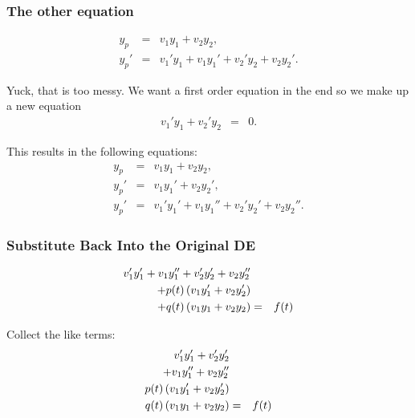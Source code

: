\begin{frame}
  \frametitle{The other equation}

  \begin{eqnarray*}
    y_p & = & v_1 y_1 + v_2 y_2, \\
    y_p' & = & v_1' y_1 + v_1 y_1' + v_2' y_2 + v_2 y_2'. 
  \end{eqnarray*}

  Yuck, that is too messy. We want a first order equation in the end
  so we make up a new equation
  \begin{eqnarray}
    \label{eqn:firstConstraint}
    v_1' y_1 + v_2' y_2 & = & 0.
  \end{eqnarray}

  This results in the following equations:
  \begin{eqnarray*}
    y_p & = & v_1 y_1 + v_2 y_2, \\
    y_p' & = & v_1 y_1' + v_2 y_2', \\
    y_p' & = & v_1' y_1' + v_1 y_1'' + v_2' y_2' + v_2 y_2''. 
  \end{eqnarray*}


\end{frame}


\begin{frame}
  \frametitle{Substitute Back Into the Original DE}

  \begin{eqnarray*}
    v_1' y_1' + v_1 y_1'' + v_2' y_2' + v_2 y_2'' & & \\
    + p(t) \left( v_1 y_1' + v_2 y_2' \right) & & \\
    + q(t) \left( v_1 y_1 + v_2 y_2 \right) & = & f(t)
  \end{eqnarray*}

  Collect the like terms:
  \begin{eqnarray*}
    v_1' y_1' + v_2' y_2'  & & \\
    + v_1 y_1'' + v_2 y_2'' & & \\
    p(t) \left( v_1 y_1' + v_2 y_2' \right) & & \\
    q(t) \left( v_1 y_1 + v_2 y_2 \right) & = & f(t)
  \end{eqnarray*}


\end{frame}


